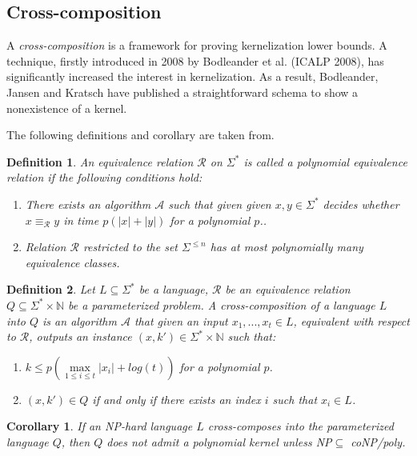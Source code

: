 \documentclass[en]{pracamgr}
\newtheorem{definition}{Definition}
\newtheorem{corollary}{Corollary}
\begin{document}
\subsection{Cross-composition}

A \emph{cross-composition} is a framework for proving kernelization lower bounds. A technique, firstly introduced in 2008 by Bodleander et al. (ICALP 2008), has significantly increased the interest in kernelization. As a result, Bodleander, Jansen and Kratsch have published a straightforward schema to show a nonexistence of a kernel.

The following definitions and corollary are taken from. %

\begin{definition}\label{polynomial equivalence relation}
	An equivalence relation $\mathcal{R}$ on $\Sigma^*$ is called a \textup{polynomial equivalence relation} if the following conditions hold:
	\begin{enumerate}
		\item There exists an algorithm $\mathcal{A}$ such that given given $x,y \in \Sigma^*$ decides whether $x \equiv_{\mathcal{R}} y$ in time $p(|x|+|y|)$ for a polynomial $p$..
		\item Relation $\mathcal{R}$ restricted to the set $\Sigma^{\leq n}$ has at most polynomially many equivalence classes.
	\end{enumerate}
\end{definition}

\begin{definition}\label{cross-composition}
	Let $L \subseteq \Sigma^*$ be a language, $\mathcal{R}$ be an equivalence relation $Q \subseteq \Sigma^* \times \mathbb{N}$ be a parameterized problem. A \textup{cross-composition} of a language $L$ into $Q$ is an algorithm $\mathcal{A}$ that given an input $x_1,...,x_t \in L$, equivalent with respect to $\mathcal{R}$, outputs an instance $(x,k') \in \Sigma^* \times \mathbb{N}$ such that:
	\begin{enumerate}
		\item $k \leq p(\max\limits_{1 \leq i \leq t} |x_i| + log(t))$ for a polynomial $p$.
		\item $(x,k') \in Q$ if and only if there exists an index $i$ such that $x_i \in L$.
	\end{enumerate}
\end{definition}

\begin{corollary}\label{nokernel}
	If an NP-hard language $L$ cross-composes into the parameterized language $Q$, then $Q$ does not admit a polynomial kernel unless \textup{NP$\subseteq$ coNP/poly}.
\end{corollary}
\end{document}
